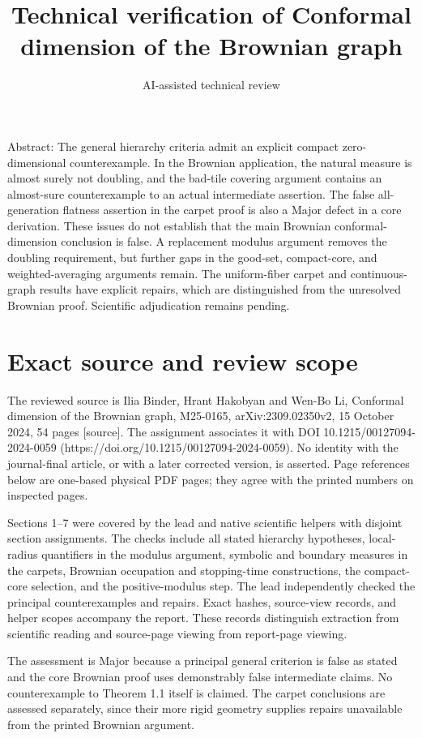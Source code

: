 \documentclass[10pt]{article}
\title{Technical verification of Conformal dimension of the Brownian graph}
\author{AI-assisted technical review}
\date{}
\begin{document}
\maketitle
Abstract: The general hierarchy criteria admit an explicit compact zero-dimensional counterexample. In the Brownian application, the natural measure is almost surely not doubling, and the bad-tile covering argument contains an almost-sure counterexample to an actual intermediate assertion. The false all-generation flatness assertion in the carpet proof is also a Major defect in a core derivation. These issues do not establish that the main Brownian conformal-dimension conclusion is false. A replacement modulus argument removes the doubling requirement, but further gaps in the good-set, compact-core, and weighted-averaging arguments remain. The uniform-fiber carpet and continuous-graph results have explicit repairs, which are distinguished from the unresolved Brownian proof. Scientific adjudication remains pending.\par
\section*{Exact source and review scope}
The reviewed source is Ilia Binder, Hrant Hakobyan and Wen-Bo Li, Conformal dimension of the Brownian graph, M25-0165, arXiv:2309.02350v2, 15 October 2024, 54 pages [source]. The assignment associates it with DOI 10.1215/00127094-2024-0059 (https://doi.org/10.1215/00127094-2024-0059). No identity with the journal-final article, or with a later corrected version, is asserted. Page references below are one-based physical PDF pages; they agree with the printed numbers on inspected pages.\par
Sections 1–7 were covered by the lead and native scientific helpers with disjoint section assignments. The checks include all stated hierarchy hypotheses, local-radius quantifiers in the modulus argument, symbolic and boundary measures in the carpets, Brownian occupation and stopping-time constructions, the compact-core selection, and the positive-modulus step. The lead independently checked the principal counterexamples and repairs. Exact hashes, source-view records, and helper scopes accompany the report. These records distinguish extraction from scientific reading and source-page viewing from report-page viewing.\par
The assessment is Major because a principal general criterion is false as stated and the core Brownian proof uses demonstrably false intermediate claims. No counterexample to Theorem 1.1 itself is claimed. The carpet conclusions are assessed separately, since their more rigid geometry supplies repairs unavailable from the printed Brownian argument.\par
\end{document}
